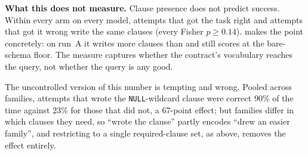 \textbf{What this does not measure.} Clause presence does not predict success.
Within every arm on every model, attempts that got the task right and attempts
that got it wrong write the same clauses (every Fisher $p{\ge}0.14$). \armH{}
makes the point concretely: on run~A it writes more clauses than \armM{} and
still scores at the bare-schema floor. The measure captures whether the
contract's vocabulary reaches the query, not whether the query is any good.

The uncontrolled version of this number is tempting and wrong. Pooled across
families, \armC{} attempts that wrote the \texttt{NULL}-wildcard clause were
correct 90\% of the time against 23\% for those that did not, a 67-point
effect; but families differ in which clauses they need, so ``wrote the
clause'' partly encodes ``drew an easier family'', and restricting to a single
required-clause set, as above, removes the effect entirely.
